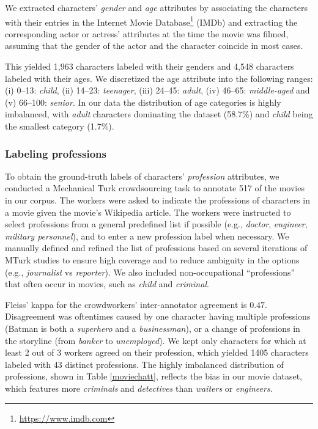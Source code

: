 We extracted characters' \textit{gender} and \textit{age} attributes by associating the characters with their entries in the Internet Movie Database\footnote{\url{https://www.imdb.com}} (IMDb) and extracting the corresponding actor or actress' attributes at the time the movie was filmed, assuming that the gender of the actor and the character coincide in most cases.

This yielded 1,963 characters labeled with their genders and 4,548 characters labeled with their ages.
We discretized the age attribute into the following ranges:
(i) 0--13: \textit{child}, (ii) 14--23: \textit{teenager}, (iii) 24--45: \textit{adult}, (iv) 46--65: \textit{middle-aged} and (v) 66--100: \textit{senior}.
In our data the distribution of age categories is highly imbalanced, with \textit{adult} characters dominating the dataset (58.7\%) and \textit{child} being the smallest category (1.7\%).

\subsubsection{Labeling professions} 
\label{kappa1}

To obtain the ground-truth labels of characters' \textit{profession} attributes, we conducted a Mechanical Turk crowdsourcing task to annotate 517 of the movies in our corpus.
The workers were asked to indicate the professions of characters in a movie given
the movie's Wikipedia article.
The workers were instructed to select professions from a general predefined list if possible (e.g., \textit{doctor}, \textit{engineer}, \textit{military personnel}), and to enter a new profession label when necessary.
We manually defined and refined the list of professions based on several iterations of MTurk studies to ensure 
high coverage
and to reduce ambiguity in the options (e.g., \textit{journalist} vs \textit{reporter}).
We also included non-occupational ``professions'' that often occur in movies,
such as \textit{child} and \textit{criminal}.

Fleiss' kappa for the crowdworkers' inter-annotator agreement is $0.47$.
Disagreement was oftentimes caused by one character having multiple professions (Batman is both a \textit{superhero} and a \textit{businessman}), or a change of professions in the storyline (from \textit{banker} to \textit{unemployed}).
We kept only characters for which at least 2 out of 3 workers agreed on their profession,
which yielded 1405 characters labeled with 43 distinct professions.
The highly imbalanced distribution of professions, shown in Table \ref{moviechatt}, reflects the bias in our movie dataset, which features more \textit{criminals} and \textit{detectives} than \textit{waiters} or \textit{engineers}.

